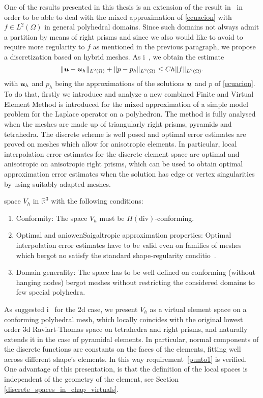 One of the results presented in this thesis is an extension 
of the result in~\cite{MR1866274} in order to be able to deal with the
mixed approximation of \eqref{ecuacion} with $f\in L^2(\Omega)$ in general polyhedral domains. 
Since such domains not always admit a partition by means of right prisms and since 
we also would like to avoid to require more regularity to $f$ as mentioned in the previous paragraph, we propose a 
discretization based on hybrid meshes. As i~\cite{MR1866274}, we obtain the estimate
\begin{equation}\label{jl2: aim}
 \|\boldsymbol{u}-\boldsymbol{u}_h\|_{L^2(\Omega)} + \|p-p_h\|_{L^2(\Omega)} \le Ch\|f\|_{L^2(\Omega)}.
\end{equation}
with $\boldsymbol{u}_h$ and $p_h$ being the approximations of the solutions $\boldsymbol{u}$ and $p$ of \eqref{ecuacion}. 
To do that, firstly we introduce and analyze a new combined Finite and Virtual 
Element Method is introduced for the 
mixed approximation of a 
simple model problem for the Laplace operator on a polyhedron. The 
method is fully analysed when the meshes are made up of triangularly
right prisms, pyramids and tetrahedra. The discrete scheme 
is well posed and optimal error estimates are proved on meshes which 
allow for anisotropic elements. In particular, local 
interpolation error estimates for the discrete element space are 
optimal and anisotropic on anisotropic right prisms, which can be
used to obtain optimal approximation error estimates when the 
solution has edge or vertex singularities by using suitably adapted meshes.   


space $V_h$ in 
$\mathbb R^3$ with the following conditions:  
\begin{enumerate}
\item \label{punto1} Conformity: The space $V_h$ must be $H(\mbox{div})$-conforming.
\item \label{punto2} Optimal and aniowenSaigaltropic approximation properties: Optimal interpolation error estimates have to be valid even on families of meshes which bergot no satisfy the standard shape-regularity conditio~\cite{ciarlet}.
\item \label{punto3} Domain generality: The space has to be well defined on conforming (without hanging nodes) bergot meshes without restricting the considered domains to few special polyhedra. 
\end{enumerate}
As suggested i~\cite{bfm} for the 2d case, we present $V_h$ as a virtual element space on a conforming 
polyhedral mesh, which 
locally coincides with the original lowest order 3d Raviart-Thomas space on
tetrahedra and right prisms, and naturally extends it in the case of pyramidal elements. 
In particular, normal components of the discrete functions are constants on the faces of the 
elements, fitting well across different shape's elements. In this way requirement~\ref{punto1} is verified. 
One advantage of this presentation, is that the definition of the local spaces is independent of the 
geometry of the element, see Section \ref{discrete_spaces_in_chap_virtuals}. 

